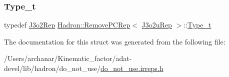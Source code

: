 \mbox{\label{structHadron_1_1RemovePCRep_3_01J3o2uRep_01_4_a589ac9849b0ccd9ee4e8affe500daad5}} 
\subsubsection{\texorpdfstring{Type\_t}{Type\_t}\hspace{0.1cm}{\footnotesize\ttfamily [2/2]}}
{\footnotesize\ttfamily typedef \mbox{\hyperlink{structHadron_1_1J3o2Rep}{J3o2\+Rep}} \mbox{\hyperlink{structHadron_1_1RemovePCRep}{Hadron\+::\+Remove\+P\+C\+Rep}}$<$ \mbox{\hyperlink{structHadron_1_1J3o2uRep}{J3o2u\+Rep}} $>$\+::\mbox{\hyperlink{structHadron_1_1RemovePCRep_3_01J3o2uRep_01_4_a589ac9849b0ccd9ee4e8affe500daad5}{Type\+\_\+t}}}



The documentation for this struct was generated from the following file\+:\begin{DoxyCompactItemize}
\item 
/\+Users/archanar/\+Kinematic\+\_\+factor/adat-\/devel/lib/hadron/do\+\_\+not\+\_\+use/\mbox{\hyperlink{adat-devel_2lib_2hadron_2do__not__use_2do__not__use_8irreps_8h}{do\+\_\+not\+\_\+use.\+irreps.\+h}}\end{DoxyCompactItemize}
